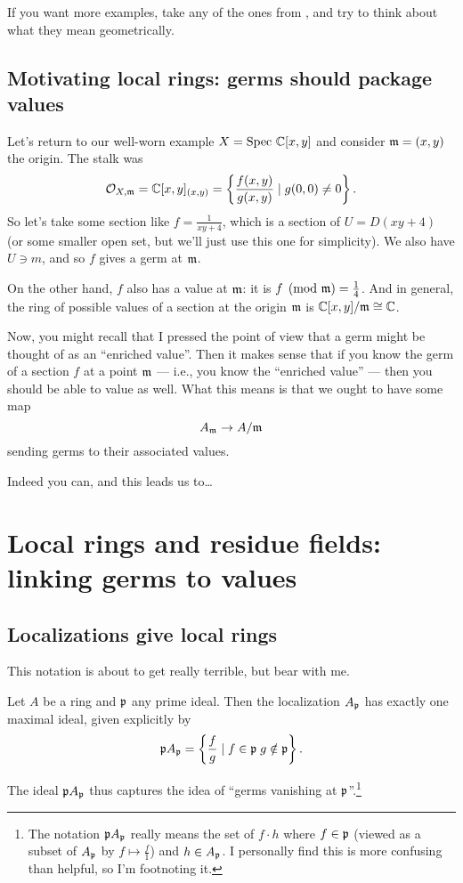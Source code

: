 If you want more examples,
take any of the ones from ,
and try to think about what they mean geometrically.

\subsection{Motivating local rings: germs should package values}
Let's return to our well-worn example $X = \text{Spec } \mathbb C[x,y]$
and consider $\mathfrak m = (x,y)$ the origin.
The stalk was
\[ \mathcal O_{X, \mathfrak m} = \mathbb C[x,y]_{(x,y)}
	= \left\{ \frac{f(x,y)}{g(x,y)} \mid g(0,0) \ne 0 \right\}. \]
So let's take some section like $f = \frac{1}{xy + 4}$,
which is a section of $U = D(xy+4)$ (or some smaller open set,
but we'll just use this one for simplicity).
We also have $U \ni m$, and so $f$ gives a germ at $\mathfrak m$.

On the other hand, $f$ also has a value at $\mathfrak m$:
it is $f \pmod{\mathfrak m} = \frac 14$.
And in general, the ring of possible values of a section
at the origin $\mathfrak m$ is $\mathbb C[x,y] / \mathfrak m \cong \mathbb C$.

Now, you might recall that I pressed the point of view
that a germ might be thought of as an ``enriched value''.
Then it makes sense that if you know the germ of a section $f$ at
a point $\mathfrak m$ --- i.e., you know the ``enriched value'' ---
then you should be able to value as well.
What this means is that we ought to have some map
\[ A_\mathfrak m \to A/\mathfrak m \]
sending germs to their associated values.

Indeed you can, and this leads us to\dots

\section{Local rings and residue fields:
linking germs to values}

\subsection{Localizations give local rings}
This notation is about to get really terrible, but bear with me.
\begin{theorem}
	\label{thm:stalks_local_ring}
	Let $A$ be a ring and $\mathfrak p$ any prime ideal.
	Then the localization $A_\mathfrak p$ has exactly one maximal ideal,
	given explicitly by
	\[ \mathfrak p A_\mathfrak p =
		\left\{ \frac fg \mid f \in \mathfrak p \; g \notin \mathfrak p \right\}. \]
\end{theorem}
The ideal $\mathfrak p A_\mathfrak p$ thus captures the idea
of ``germs vanishing at $\mathfrak p$''.\footnote{The notation $\mathfrak p A_\mathfrak p$ really means
the set of $f \cdot h$ where $f \in \mathfrak p$
(viewed as a subset of $A_\mathfrak p$ by $f \mapsto \frac f1$) and $h \in A_{\mathfrak p}$.
I personally find this is more confusing than helpful,
so I'm footnoting it.}

